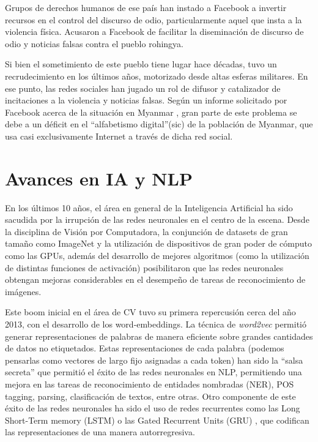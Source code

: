 Grupos de derechos humanos de ese país han instado a Facebook a invertir recursos en el control del discurso de odio, particularmente aquel que insta a la violencia física\cite{irrawaddy2018zuckerberg}. Acusaron a Facebook de facilitar la diseminación de discurso de odio y noticias falsas contra el pueblo rohingya.

Si bien el sometimiento de este pueblo tiene lugar hace décadas, tuvo un recrudecimiento en los últimos años, motorizado desde altas esferas militares. En ese punto, las redes sociales han jugado un rol de difusor y catalizador de incitaciones a la violencia y noticias falsas. Según un informe solicitado por Facebook acerca de la situación en Myanmar \cite{warofka2018independent}, gran parte de este problema se debe a un déficit en el ``alfabetismo digital''(sic) de la población de Myanmar, que usa casi exclusivamente Internet a través de dicha red social.





\section{Avances en IA y NLP}

En los últimos 10 años, el área en general de la Inteligencia Artificial ha sido sacudida por la irrupción de las redes neuronales en el centro de la escena. Desde la disciplina de Visión por Computadora, la conjunción de datasets de gran tamaño como ImageNet \cite{imagenet2009deng} y la utilización de dispositivos de gran poder de cómputo como las GPUs, además del desarrollo de mejores algoritmos (como la utilización de distintas funciones de activación) posibilitaron que las redes neuronales obtengan mejoras considerables en el desempeño de tareas de reconocimiento de imágenes. 

Este boom inicial en el área de CV tuvo su primera repercusión cerca del año 2013, con el desarrollo de los word-embeddings. La técnica de \emph{word2vec}\cite{mikolov2013distributed} permitió generar representaciones de palabras de manera eficiente sobre grandes cantidades de datos no etiquetados. Estas representaciones de cada palabra (podemos pensarlas como vectores de largo fijo asignadas a cada token) han sido la ``salsa secreta'' que permitió el éxito de las redes neuronales en NLP, permitiendo una mejora en las tareas de reconocimiento de entidades nombradas (NER), POS tagging, parsing, clasificación de textos, entre otras. Otro componente de este éxito de las redes neuronales ha sido el uso de redes recurrentes como las Long Short-Term memory (LSTM) \cite{hochreiter1997long} o las Gated Recurrent Units (GRU) \cite{cho-etal-2014-learning}, que codifican las representaciones de una manera autorregresiva.

